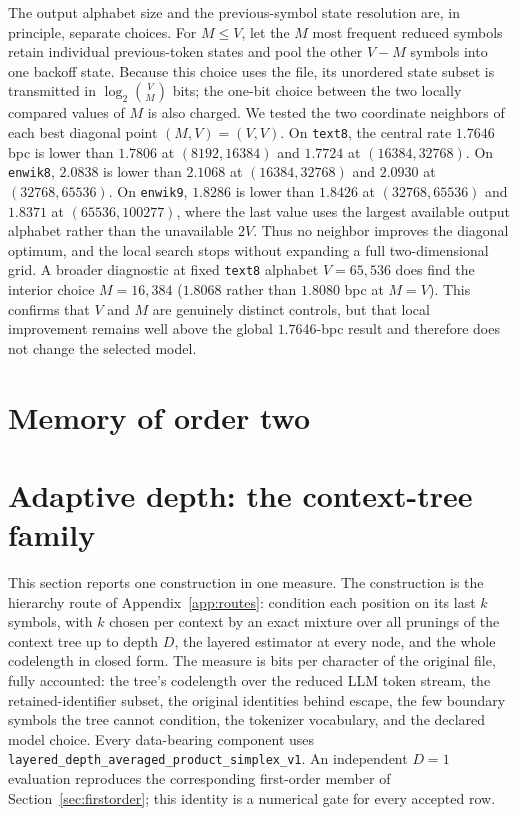 \documentclass[11pt]{article}
\begin{document}
The output alphabet size and the previous-symbol state resolution are, in
principle, separate choices.  For $M\leq V$, let the $M$ most frequent reduced
symbols retain individual previous-token states and pool the other $V-M$
symbols into one backoff state.  Because this choice uses the file, its
unordered state subset is transmitted in $\log_2\binom{V}{M}$ bits; the
one-bit choice between the two locally compared values of $M$ is also
charged.  We tested the two coordinate neighbors of each best diagonal point
$(M,V)=(V,V)$.  On \texttt{text8}, the central rate $1.7646$ bpc is lower than
$1.7806$ at $(8192,16384)$ and $1.7724$ at $(16384,32768)$.  On
\texttt{enwik8}, $2.0838$ is lower than $2.1068$ at $(16384,32768)$ and
$2.0930$ at $(32768,65536)$.  On \texttt{enwik9}, $1.8286$ is lower than
$1.8426$ at $(32768,65536)$ and $1.8371$ at $(65536,100277)$, where the last
value uses the largest available output alphabet rather than the unavailable
$2V$.  Thus no neighbor improves the diagonal optimum, and the local search
stops without expanding a full two-dimensional grid.  A broader diagnostic
at fixed \texttt{text8} alphabet $V=65{,}536$ does find the interior choice
$M=16{,}384$ ($1.8068$ rather than $1.8080$ bpc at $M=V$).  This confirms
that $V$ and $M$ are genuinely distinct controls, but that local improvement
remains well above the global $1.7646$-bpc result and therefore does not
change the selected model.

\section{Memory of order two}
\label{sec:ordertwo}



\section{Adaptive depth: the context-tree family}
\label{sec:ctree}

This section reports one construction in one measure.  The
construction is the hierarchy route of Appendix~\ref{app:routes}:
condition each position on its last $k$ symbols, with $k$ chosen per
context by an exact mixture over all prunings of the context tree up
to depth $D$, the layered estimator at every node, and the whole
codelength in closed form.  The measure is bits per character of the
original file, fully accounted: the tree's codelength over the reduced LLM
token stream, the retained-identifier subset, the original identities behind
escape, the few boundary symbols the tree cannot condition, the tokenizer
vocabulary, and the declared model choice.  Every data-bearing component uses
\texttt{layered\_depth\_averaged\_product\_simplex\_v1}.  An independent
$D=1$ evaluation reproduces the corresponding first-order member of
Section~\ref{sec:firstorder}; this identity is a numerical gate for every
accepted row.
\end{document}

